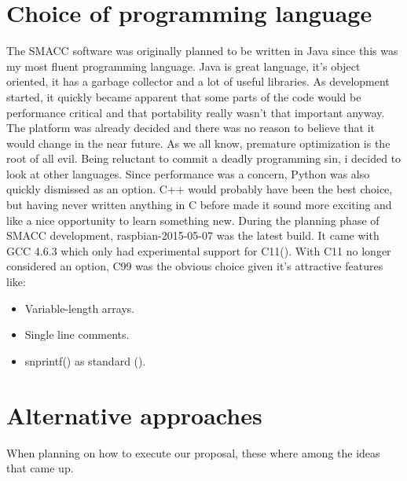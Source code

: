 \documentclass[12pt,english,a4paper]{report}
\begin{document}
\section{Choice of programming language}
The SMACC software was originally planned to be written in Java since this was my most fluent programming language. Java is great language, it's object oriented, it has a garbage collector and a lot of useful libraries. As development started, it quickly became apparent that some parts of the code would be performance critical and that portability really wasn't that important anyway. The platform was already decided and there was no reason to believe that it would change in the near future. As we all know, premature optimization is the root of all evil. Being reluctant to commit a deadly programming sin, i decided to look at other languages. Since performance was a concern, Python was also quickly dismissed as an option. C++ would probably have been the best choice, but having never written anything in C before made it sound more exciting and like a nice opportunity to learn something new. During the planning phase of SMACC development, raspbian-2015-05-07 was the latest build. It came with GCC 4.6.3 which only had experimental support for C11(\cite{GCC11}). With C11 no longer considered an option, C99 was the obvious choice given it's attractive features like:
\begin{itemize}
  \item Variable-length arrays.
  \item Single line comments.
  \item snprintf() as standard (\cite{C_RATIONAL}).
\end{itemize}

\section{Alternative approaches}\label{da}
When planning on how to execute our proposal, these where among the ideas that came up. 
\end{document}
